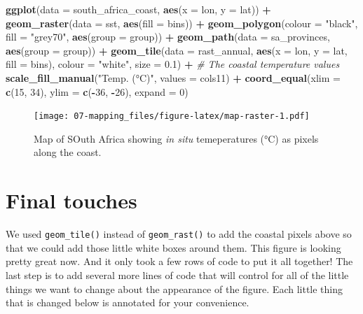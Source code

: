 \documentclass[]{book}
\newenvironment{Shaded}{\begin{snugshade}}{\end{snugshade}}
\newcommand{\KeywordTok}[1]{\textcolor[rgb]{0.13,0.29,0.53}{\textbf{#1}}}
\newcommand{\DataTypeTok}[1]{\textcolor[rgb]{0.13,0.29,0.53}{#1}}
\newcommand{\DecValTok}[1]{\textcolor[rgb]{0.00,0.00,0.81}{#1}}
\newcommand{\FloatTok}[1]{\textcolor[rgb]{0.00,0.00,0.81}{#1}}
\newcommand{\StringTok}[1]{\textcolor[rgb]{0.31,0.60,0.02}{#1}}
\newcommand{\CommentTok}[1]{\textcolor[rgb]{0.56,0.35,0.01}{\textit{#1}}}
\newcommand{\OperatorTok}[1]{\textcolor[rgb]{0.81,0.36,0.00}{\textbf{#1}}}
\newcommand{\NormalTok}[1]{#1}
\theoremstyle{definition}
\theoremstyle{definition}
\theoremstyle{definition}
\theoremstyle{remark}
\begin{document}
\begin{Shaded}
\begin{Highlighting}[]
\KeywordTok{ggplot}\NormalTok{(}\DataTypeTok{data =}\NormalTok{ south_africa_coast, }\KeywordTok{aes}\NormalTok{(}\DataTypeTok{x =}\NormalTok{ lon, }\DataTypeTok{y =}\NormalTok{ lat)) }\OperatorTok{+}
\StringTok{  }\KeywordTok{geom_raster}\NormalTok{(}\DataTypeTok{data =}\NormalTok{ sst, }\KeywordTok{aes}\NormalTok{(}\DataTypeTok{fill =}\NormalTok{ bins)) }\OperatorTok{+}
\StringTok{  }\KeywordTok{geom_polygon}\NormalTok{(}\DataTypeTok{colour =} \StringTok{"black"}\NormalTok{, }\DataTypeTok{fill =} \StringTok{"grey70"}\NormalTok{, }\KeywordTok{aes}\NormalTok{(}\DataTypeTok{group =}\NormalTok{ group)) }\OperatorTok{+}
\StringTok{  }\KeywordTok{geom_path}\NormalTok{(}\DataTypeTok{data =}\NormalTok{ sa_provinces, }\KeywordTok{aes}\NormalTok{(}\DataTypeTok{group =}\NormalTok{ group)) }\OperatorTok{+}
\StringTok{  }\KeywordTok{geom_tile}\NormalTok{(}\DataTypeTok{data =}\NormalTok{ rast_annual, }\KeywordTok{aes}\NormalTok{(}\DataTypeTok{x =}\NormalTok{ lon, }\DataTypeTok{y =}\NormalTok{ lat, }\DataTypeTok{fill =}\NormalTok{ bins), }
            \DataTypeTok{colour =} \StringTok{"white"}\NormalTok{, }\DataTypeTok{size =} \FloatTok{0.1}\NormalTok{) }\OperatorTok{+}\StringTok{ }\CommentTok{# The coastal temperature values}
\StringTok{  }\KeywordTok{scale_fill_manual}\NormalTok{(}\StringTok{"Temp. (°C)"}\NormalTok{, }\DataTypeTok{values =}\NormalTok{ cols11) }\OperatorTok{+}
\StringTok{  }\KeywordTok{coord_equal}\NormalTok{(}\DataTypeTok{xlim =} \KeywordTok{c}\NormalTok{(}\DecValTok{15}\NormalTok{, }\DecValTok{34}\NormalTok{), }\DataTypeTok{ylim =} \KeywordTok{c}\NormalTok{(}\OperatorTok{-}\DecValTok{36}\NormalTok{, }\OperatorTok{-}\DecValTok{26}\NormalTok{), }\DataTypeTok{expand =} \DecValTok{0}\NormalTok{)}
\end{Highlighting}
\end{Shaded}

\begin{figure}
\centering
\texttt{[image: 07-mapping\_files/figure-latex/map-raster-1.pdf]}
\caption{\label{fig:map-raster}Map of SOuth Africa showing \emph{in situ}
temeperatures (°C) as pixels along the coast.}
\end{figure}

\section{Final touches}\label{final-touches}

We used \texttt{geom\_tile()} instead of \texttt{geom\_rast()} to add
the coastal pixels above so that we could add those little white boxes
around them. This figure is looking pretty great now. And it only took a
few rows of code to put it all together! The last step is to add several
more lines of code that will control for all of the little things we
want to change about the appearance of the figure. Each little thing
that is changed below is annotated for your convenience.
\end{document}
